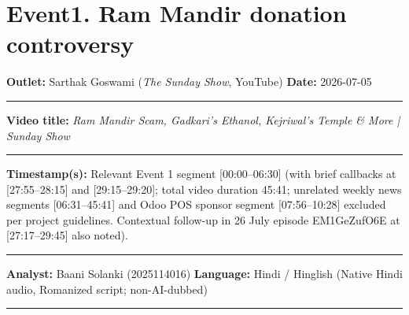 \documentclass[10pt,a4paper]{article}
\newcommand{\formrule}{\par\vspace{3pt}\noindent\rule{\textwidth}{0.35pt}\par\vspace{7pt}}
\newcommand{\sectionrule}{\par\vspace{4pt}\noindent\rule{\textwidth}{0.4pt}\par\vspace{8pt}}
\begin{document}
\vspace{4pt}

\newpage


\section*{Event1. Ram Mandir donation controversy}
\par\vspace{6pt}
\noindent\textbf{Outlet:} Sarthak Goswami (\emph{The Sunday Show}, YouTube) \hfill \textbf{Date:} 2026-07-05
\formrule
\noindent\textbf{Video title:} \emph{Ram Mandir Scam, Gadkari's Ethanol, Kejriwal's Temple \& More | Sunday Show}
\formrule
\noindent\textbf{Timestamp(s):} Relevant Event 1 segment [00:00--06:30] (with brief callbacks at [27:55--28:15] and [29:15--29:20]; total video duration 45:41; unrelated weekly news segments [06:31--45:41] and Odoo POS sponsor segment [07:56--10:28] excluded per project guidelines. Contextual follow-up in 26 July episode EM1GeZufO6E at [27:17--29:45] also noted).
\formrule
\noindent\textbf{Analyst:} Baani Solanki (2025114016) \hfill \textbf{Language:} Hindi / Hinglish (Native Hindi audio, Romanized script; non-AI-dubbed)
\sectionrule
\end{document}
